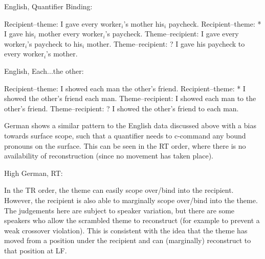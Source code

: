 \begin{exe}
	\ex English, Quantifier Binding:\label{ex:en-qb}
\begin{xlist}
\ex Recipient--theme: I gave every worker$_i$'s mother his$_i$ paycheck.
\ex Recipient--theme: * I gave his$_i$ mother every worker$_i$'s paycheck.
\ex Theme--recipient: I gave every worker$_i$'s paycheck to his$_i$ mother.
\ex Theme--recipient: ? I gave his paycheck to every worker$_i$'s mother.
\end{xlist}

\ex English, Each...the other:\label{ex:en-eachother}
\begin{xlist}
\ex Recipient--theme: I showed each man the other's friend.
\ex Recipient--theme: * I showed the other's friend each man.
\ex Theme--recipient: I showed each man to the other's friend.
\ex Theme--recipient: ? I showed the other's friend to each man.
\end{xlist}
\end{exe}

German shows a similar pattern to the English data discussed above with a bias towards surface scope, such that a quantifier needs to c-command any bound pronouns on the surface. This can be seen in the RT order, where there is no availability of reconstruction (since no movement has taken place).

\begin{exe}
	\ex High German, RT:\label{ex:hg-binding-rt}
\begin{xlist}
\end{xlist}
\end{exe}

In the TR order, the theme can easily scope over/bind into the recipient. However, the recipient is also able to marginally scope over/bind into the theme. The judgements here are subject to speaker variation, but there are some speakers who allow the scrambled theme to reconstruct (for example to prevent a weak crossover violation). This is consistent with the idea that the theme has moved from a position under the recipient and can (marginally) reconstruct to that position at LF.

